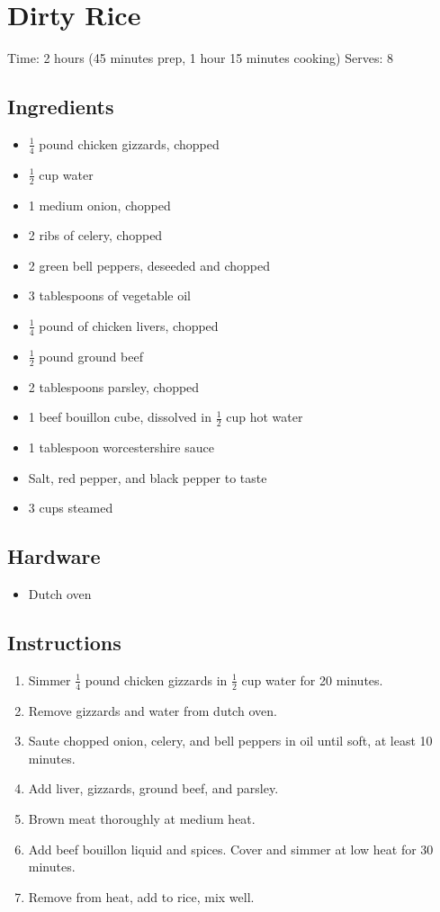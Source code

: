 \section{Dirty Rice}
\label{dirtyRice}
\setcounter{secnumdepth}{0}
Time: 2 hours (45 minutes prep, 1 hour 15 minutes cooking)
Serves: 8

\begin{multicols}{2}
\subsection*{Ingredients}
\begin{itemize}
    \item \( \frac{1}{4} \) pound chicken gizzards, chopped
    \item \( \frac{1}{2} \) cup water
    \item 1 medium onion, chopped
    \item 2 ribs of celery, chopped
    \item 2 green bell peppers, deseeded and chopped
    \item 3 tablespoons of vegetable oil
    \item \( \frac{1}{4} \) pound of chicken livers, chopped
    \item \( \frac{1}{2} \) pound ground beef
    \item 2 tablespoons parsley, chopped
    \item 1 beef bouillon cube, dissolved in \( \frac{1}{2} \) cup hot water
    \item 1 tablespoon worcestershire sauce
    \item Salt, red pepper, and black pepper to taste
    \item 3 cups steamed 
\end{itemize}

\subsection*{Hardware}
\begin{itemize}
    \item Dutch oven
\end{itemize}
\clearpage

\subsection*{Instructions}
\begin{enumerate}
    \item Simmer \( \frac{1}{4} \) pound chicken gizzards in \( \frac{1}{2} \) cup water for 20 minutes.
    \item Remove gizzards and water from dutch oven.
    \item Saute chopped onion, celery, and bell peppers in oil until soft, at least 10 minutes.
    \item Add liver, gizzards, ground beef, and parsley.
    \item Brown meat thoroughly at medium heat.
    \item Add beef bouillon liquid and spices. Cover and simmer at low heat for 30 minutes.
    \item Remove from heat, add to rice, mix well.


\end{enumerate}
\end{multicols}
